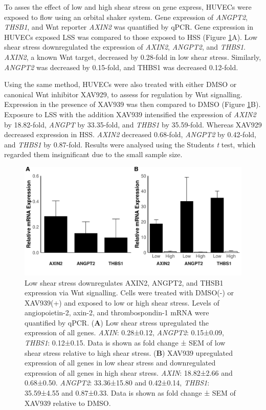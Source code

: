 \documentclass[
  11pt,
]{article}
\begin{document}
To asses the effect of low and high shear stress on gene express, HUVECs were exposed to flow using an orbital shaker system.
Gene expression of \emph{ANGPT2}, \emph{THSB1}, and Wnt reporter \emph{AXIN2} was quantified by qPCR.
Gene expression in HUVECs exposed LSS was compared to those exposed to HSS (Figure \ref{fig:plots}A).
Low shear stress downregulated the expression of \emph{AXIN2}, \emph{ANGPT2}, and \emph{THBS1}.
\emph{AXIN2}, a known Wnt target, decreased by 0.28-fold in low shear stress.
Similarly, \emph{ANGPT2} was decreased by 0.15-fold, and THBS1 was decreased 0.12-fold.

Using the same method, HUVECs were also treated with either DMSO or canonical Wnt inhibitor XAV929, to assess for regulation by Wnt signalling.
Expression in the presence of XAV939 was then compared to DMSO (Figure \ref{fig:plots}B).
Exposure to LSS with the addition XAV939 intensified the expression of \emph{AXIN2} by 18.82-fold, \emph{ANGPT} by 33.35-fold, and \emph{THBS1} by 35.59-fold.
Whereas XAV929 decreased expression in HSS.
\emph{AXIN2} decreased 0.68-fold, \emph{ANGPT2} by 0.42-fold, and \emph{THBS1} by 0.87-fold.
Results were analysed using the Students \emph{t} test, which regarded them insignificant due to the small sample size.

\begin{figure}

{\centering \includegraphics{report_files/figure-latex/plots-1} 

}

\caption{Low shear stress downregulates AXIN2, ANGPT2, and THSB1 expression via Wnt signalling. Cells were treated with DMSO(-) or XAV939(+) and exposed to low or high shear stress. Levels of angiopoietin-2, axin-2, and thrombospondin-1 mRNA were quantified by qPCR. (\textbf{A}) Low shear stress upregulated the expression of all genes. \emph{AXIN}: 0.28±0.12, \emph{ANGPT2}: 0.15±0.09, \emph{THBS1}: 0.12±0.15. Data is shown as fold change ± SEM of low shear stress relative to high shear stress. (\textbf{B}) XAV939 upregulated expression of all genes in low shear stress and downregulated expression of all genes in high shear stress. \emph{AXIN}: 18.82±2.66 and 0.68±0.50. \emph{ANGPT2}: 33.36±15.80 and 0.42±0.14, \emph{THBS1}: 35.59±4.55 and 0.87±0.33. Data is shown as fold change ± SEM of XAV939 relative to DMSO.}\label{fig:plots}
\end{figure}
\end{document}

